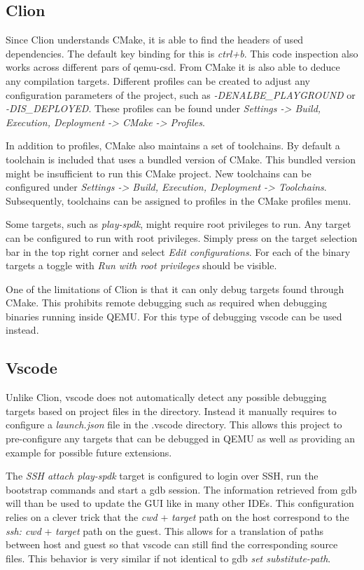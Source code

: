 \documentclass[conference]{IEEEtran}
\begin{document}
\subsection{Clion}

Since Clion understands CMake, it is able to find the headers of used
dependencies. The default key binding for this is \textit{ctrl+b}. This code
inspection also works across different pars of qemu-csd. From CMake it is also
able to deduce any compilation targets. Different profiles can be created to
adjust any configuration parameters of the project, such as
\textit{-DENALBE\_PLAYGROUND} or \textit{-DIS\_DEPLOYED}. These profiles can be
found  under \textit{Settings -> Build, Execution, Deployment -> CMake -> Profiles}.

In addition to profiles, CMake also maintains a set of toolchains. By default
a toolchain is included that uses a bundled version of CMake. This bundled
version might be insufficient to run this CMake project. New toolchains can be
configured under \textit{Settings -> Build, Execution, Deployment -> Toolchains}.
Subsequently, toolchains can be assigned to profiles in the CMake profiles menu.

Some targets, such as \textit{play-spdk}, might require root privileges to run.
Any target can be configured to run with root privileges. Simply press on the
target selection bar in the top right corner and select
\textit{Edit configurations}. For each of the binary targets a toggle with
\textit{Run with root privileges} should be visible.

One of the limitations of Clion is that it can only debug targets found through
CMake. This prohibits remote debugging such as required when debugging binaries
running inside QEMU. For this type of debugging vscode can be used instead.

\subsection{Vscode}

Unlike Clion, vscode does not automatically detect any possible debugging
targets based on project files in the directory. Instead it manually requires to
configure a \textit{launch.json} file in the .vscode directory. This allows this
project to pre-configure any targets that can be debugged in QEMU as well as
providing an example for possible future extensions.

The \textit{SSH attach play-spdk} target is configured to login over SSH, run
the bootstrap commands and start a gdb session. The information retrieved from
gdb will than be used to update the GUI like in many other IDEs. This
configuration relies on a clever trick that the \textit{cwd} + \textit{target}
path on the host correspond to the \textit{ssh: cwd} + \textit{target} path on
the guest. This allows for a translation of paths between host and guest so
that vscode can  still find the corresponding source files. This behavior is
very similar if not identical to gdb \textit{set substitute-path}.
\end{document}
